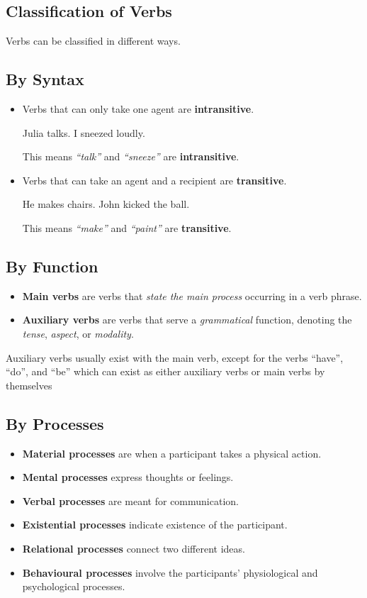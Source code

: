 \documentclass[../main.tex]{subfiles}
\begin{document}
 	\subsection{Classification of Verbs}
	Verbs can be classified in different ways. 
	
	\subsection*{By Syntax}
	\begin{itemize}
		\item Verbs that can only take one agent are \textbf{intransitive}.
		\begin{exe}
			\ex Julia talks.
			\ex I sneezed loudly.
		\end{exe}
		This means \textit{``talk''} and \textit{``sneeze''} are \textbf{intransitive}.
		\item Verbs that can take an agent and a recipient are \textbf{transitive}.
		\begin{exe}
			\ex He makes chairs.
			\ex[*] {He makes.}
			\ex John kicked the ball.
			\ex[*] {John kicked.}
		\end{exe}
		This means \textit{``make''} and \textit{``paint''} are \textbf{transitive}.
	\end{itemize}
	
	\subsection*{By Function}
	\begin{itemize}
		\item \textbf{Main verbs} are verbs that \textit{state the main process} occurring in a verb phrase.
		\item \textbf{Auxiliary verbs} are verbs that serve a \textit{grammatical} function, denoting the \textit{tense}, \textit{aspect}, or \textit{modality}.
	\end{itemize}
	Auxiliary verbs usually exist with the main verb, except for the verbs ``have'', ``do'', and ``be'' which can exist as either auxiliary verbs or main verbs by themselves 

	\subsection*{By Processes}
	\begin{itemize}
		\item \textbf{Material processes} are when a participant takes a physical action.
		\item \textbf{Mental processes} express thoughts or feelings.
		\item \textbf{Verbal processes} are meant for communication.
		\item \textbf{Existential processes} indicate existence of the participant.
		\item \textbf{Relational processes} connect two different ideas.
		\item \textbf{Behavioural processes} involve the participants' physiological and psychological processes.
	\end{itemize}
\end{document}
